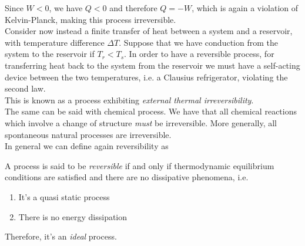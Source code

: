 \documentclass[../qm.tex]{subfiles}
\begin{document}
Since $W<0$, we have $Q<0$ and therefore $Q=-W$, which is again a violation of Kelvin-Planck, making this process irreversible.\\
Consider now instead a finite transfer of heat between a system and a reservoir, with temperature difference $\Delta T$. Suppose that we have conduction from the system to the reservoir if $T_r<T_s$. In order to have a reversible process, for transferring heat back to the system from the reservoir we must have a self-acting device between the two temperatures, i.e. a Clausius refrigerator, violating the second law.\\
This is known as a process exhibiting \textit{external thermal irreversibility}.\\
The same can be said with chemical process. We have that all chemical reactions which involve a change of structure \textit{must} be irreversible. More generally, all spontaneous natural processes are irreversible.\\
In general we can define again reversibility as
\begin{dfn}
	A process is said to be \emph{reversible} if and only if thermodynamic equilibrium conditions are satisfied and there are no dissipative phenomena, i.e.
	\begin{enumerate}
	\item It's a quasi static process
	\item There is no energy dissipation
	\end{enumerate}
	Therefore, it's an \textit{ideal} process.
\end{dfn}
\end{document}
